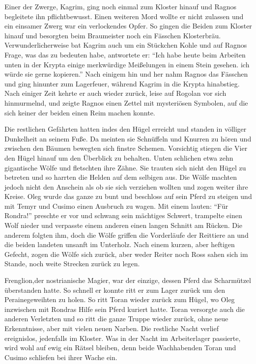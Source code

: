 Einer der Zwerge, Kagrim, ging noch einmal zum Kloster hinauf und Ragnos begleitete ihn pflichtbewusst. Einen weiteren Mord wollte er nicht zulassen und ein einsamer Zwerg war ein verlockendes Opfer. So gingen die Beiden zum Kloster hinauf und besorgten beim Braumeister noch ein Fässchen Klosterbräu. Verwunderlicherweise bat Kagrim auch um ein Stückchen Kohle und auf Ragnos Frage, was das zu bedeuten habe, antwortete er: ``Ich habe heute beim Arbeiten unten in der Krypta einige merkwürdige Meißelungen in einem Stein gesehen. ich würde sie gerne kopieren.'' Nach einigem hin und her nahm Ragnos das Fässchen und ging hinunter zum Lagerfeuer, während Kagrim in die Krypta hinabstieg. Nach einiger Zeit kehrte er auch wieder zurück, leise auf Rogolan vor sich hinmurmelnd, und zeigte Ragnos einen Zettel mit mysteriösen Symbolen, auf die sich keiner der beiden einen Reim machen konnte.

Die restlichen Gefährten hatten indes den Hügel erreicht und standen in völliger Dunkelheit an seinem Fuße. Da meinten sie Schnüffeln und Knurren zu hören und zwischen den Bäumen bewegten sich finstre Schemen. Vorsichtig stiegen die Vier den Hügel hinauf um den Überblick zu behalten. Unten schlichen etwa zehn gigantische Wölfe und fletschten ihre Zähne. Sie trauten sich nicht den Hügel zu betreten und so harrten die Helden auf dem selbigen aus. Die Wölfe machten jedoch nicht den Anschein als ob sie sich verziehen wollten und zogen weiter ihre Kreise. Oleg wurde das ganze zu bunt und beschloss auf sein Pferd zu steigen und mit Temyr und Cusimo einen Ausbruch zu wagen. Mit einem lauten: ``Für Rondra!'' preschte er vor und schwang sein mächtiges Schwert, trampelte einen Wolf nieder und verpasste einem anderen einen langen Schnitt am Rücken. Die anderem folgten ihm, doch die Wölfe griffen die Vorderläufe der Reittiere an und die beiden landeten unsanft im Unterholz. Nach einem kurzen, aber heftigen Gefecht, zogen die Wölfe sich zurück, aber weder Reiter noch Ross sahen sich im Stande, noch weite Strecken zurück zu legen.

Frenglion,der nostrianische Magier, war der einzige, dessen Pferd das Scharmützel überstanden hatte. So schnell er konnte ritt er zum Lager zurück um den Perainegeweihten zu holen. So ritt Toran wieder zurück zum Hügel, wo Oleg inzwischen mit Rondras Hilfe sein Pferd kuriert hatte. Toran versorgte auch die anderen Verletzten und so ritt die ganze Truppe wieder zurück, ohne neue Erkenntnisse, aber mit vielen neuen Narben. Die restliche Nacht verlief ereignislos, jedenfalls im Kloster. Was in der Nacht im Arbeiterlager passierte, wird wohl auf ewig ein Rätsel bleiben, denn beide Wachhabenden Toran und Cusimo schliefen bei ihrer Wache ein.

